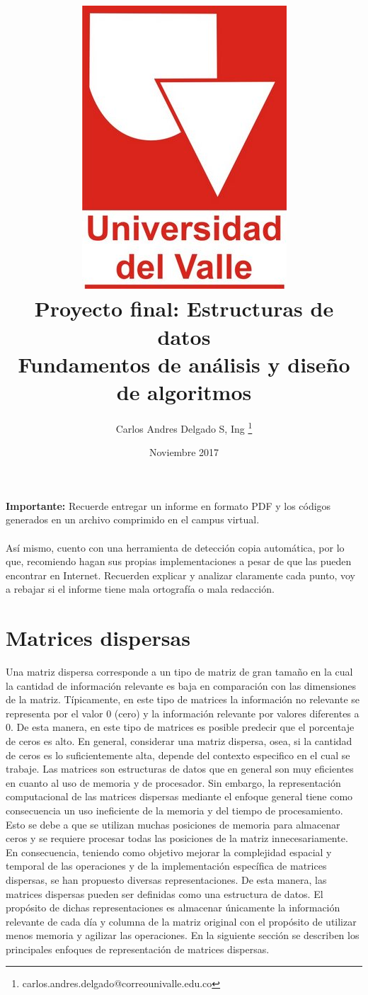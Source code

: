 \documentclass[onecolumn]{article}
\title{\vspace{-2cm}\includegraphics[scale=0.15]{univalle.jpg} \\ Proyecto final: Estructuras de datos \\ Fundamentos de análisis y diseño de algoritmos\vspace{-0.35cm}}
\author{Carlos Andres Delgado S, Ing \footnote{ carlos.andres.delgado@correounivalle.edu.co }}
\date{\vspace{-0.25cm}Noviembre 2017}
\begin{document}
\maketitle

\textbf{Importante:} Recuerde entregar un informe en formato PDF y los códigos generados en un archivo comprimido en el campus virtual.
\\\\Así mismo, cuento con una herramienta de detección copia automática, por lo que, recomiendo hagan sus propias implementaciones a pesar de que las pueden encontrar en Internet. Recuerden explicar y analizar claramente cada punto, voy a rebajar si el informe tiene mala ortografía o mala redacción.

\section{Matrices dispersas}
Una matriz dispersa corresponde a un tipo de matriz de gran tamaño en la cual la cantidad de información
relevante es baja en comparación con las dimensiones de la matriz. Típicamente, en este tipo de matrices
la información no relevante se representa por el valor 0 (cero) y la información relevante por valores diferentes
a 0. De esta manera, en este tipo de matrices es posible predecir que el porcentaje de ceros es alto.
En general, considerar una matriz dispersa, osea, si la cantidad de ceros es lo suficientemente alta, depende
del contexto especifico en el cual se trabaje. Las matrices son estructuras de datos que en general
son muy eficientes en cuanto al uso de memoria y de procesador. Sin embargo, la representación computacional
de las matrices dispersas mediante el enfoque general tiene como consecuencia un uso ineficiente de la memoria y del tiempo de procesamiento. Esto se
debe a que se utilizan muchas posiciones de memoria para almacenar ceros y se requiere procesar todas las posiciones de la matriz innecesariamente.
En consecuencia, teniendo como objetivo mejorar la complejidad espacial y temporal de las operaciones y de la implementación específica de matrices dispersas,
se han propuesto diversas representaciones. De esta manera, las matrices dispersas pueden ser definidas como una estructura de datos. El propósito de dichas
representaciones es almacenar únicamente la información relevante de cada día y columna de la matriz original con el propósito de utilizar menos memoria
y agilizar las operaciones. En la siguiente sección se describen los principales enfoques de representación de matrices dispersas.
\end{document}
